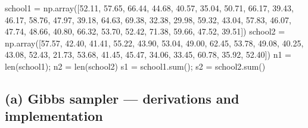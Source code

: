 \documentclass[
  letterpaper,
  DIV=11,
  numbers=noendperiod]{scrartcl}
\newenvironment{Shaded}{\begin{snugshade}}{\end{snugshade}}
\newcommand{\BuiltInTok}[1]{\textcolor[rgb]{0.00,0.23,0.31}{#1}}
\newcommand{\FloatTok}[1]{\textcolor[rgb]{0.68,0.00,0.00}{#1}}
\newcommand{\NormalTok}[1]{\textcolor[rgb]{0.00,0.23,0.31}{#1}}
\newcommand{\OperatorTok}[1]{\textcolor[rgb]{0.37,0.37,0.37}{#1}}
\begin{document}
\begin{Shaded}
\begin{Highlighting}[]
\NormalTok{school1 }\OperatorTok{=}\NormalTok{ np.array([}\FloatTok{52.11}\NormalTok{, }\FloatTok{57.65}\NormalTok{, }\FloatTok{66.44}\NormalTok{, }\FloatTok{44.68}\NormalTok{, }\FloatTok{40.57}\NormalTok{, }\FloatTok{35.04}\NormalTok{, }\FloatTok{50.71}\NormalTok{, }\FloatTok{66.17}\NormalTok{,}
                    \FloatTok{39.43}\NormalTok{, }\FloatTok{46.17}\NormalTok{, }\FloatTok{58.76}\NormalTok{, }\FloatTok{47.97}\NormalTok{, }\FloatTok{39.18}\NormalTok{, }\FloatTok{64.63}\NormalTok{, }\FloatTok{69.38}\NormalTok{, }\FloatTok{32.38}\NormalTok{,}
                    \FloatTok{29.98}\NormalTok{, }\FloatTok{59.32}\NormalTok{, }\FloatTok{43.04}\NormalTok{, }\FloatTok{57.83}\NormalTok{, }\FloatTok{46.07}\NormalTok{, }\FloatTok{47.74}\NormalTok{, }\FloatTok{48.66}\NormalTok{, }\FloatTok{40.80}\NormalTok{,}
                    \FloatTok{66.32}\NormalTok{, }\FloatTok{53.70}\NormalTok{, }\FloatTok{52.42}\NormalTok{, }\FloatTok{71.38}\NormalTok{, }\FloatTok{59.66}\NormalTok{, }\FloatTok{47.52}\NormalTok{, }\FloatTok{39.51}\NormalTok{])}
\NormalTok{school2 }\OperatorTok{=}\NormalTok{ np.array([}\FloatTok{57.57}\NormalTok{, }\FloatTok{42.40}\NormalTok{, }\FloatTok{41.41}\NormalTok{, }\FloatTok{55.22}\NormalTok{, }\FloatTok{43.90}\NormalTok{, }\FloatTok{53.04}\NormalTok{, }\FloatTok{49.00}\NormalTok{, }\FloatTok{62.45}\NormalTok{,}
                    \FloatTok{53.78}\NormalTok{, }\FloatTok{49.08}\NormalTok{, }\FloatTok{40.25}\NormalTok{, }\FloatTok{43.08}\NormalTok{, }\FloatTok{52.43}\NormalTok{, }\FloatTok{21.73}\NormalTok{, }\FloatTok{53.68}\NormalTok{, }\FloatTok{41.45}\NormalTok{,}
                    \FloatTok{45.47}\NormalTok{, }\FloatTok{34.06}\NormalTok{, }\FloatTok{33.45}\NormalTok{, }\FloatTok{60.78}\NormalTok{, }\FloatTok{35.92}\NormalTok{, }\FloatTok{52.40}\NormalTok{])}
\NormalTok{n1 }\OperatorTok{=} \BuiltInTok{len}\NormalTok{(school1)}\OperatorTok{;}\NormalTok{ n2 }\OperatorTok{=} \BuiltInTok{len}\NormalTok{(school2)}
\NormalTok{s1 }\OperatorTok{=}\NormalTok{ school1.}\BuiltInTok{sum}\NormalTok{()}\OperatorTok{;}\NormalTok{ s2 }\OperatorTok{=}\NormalTok{ school2.}\BuiltInTok{sum}\NormalTok{()}
\end{Highlighting}
\end{Shaded}

\subsection{(a) Gibbs sampler --- derivations and
implementation}\label{a-gibbs-sampler-derivations-and-implementation}
\end{document}
